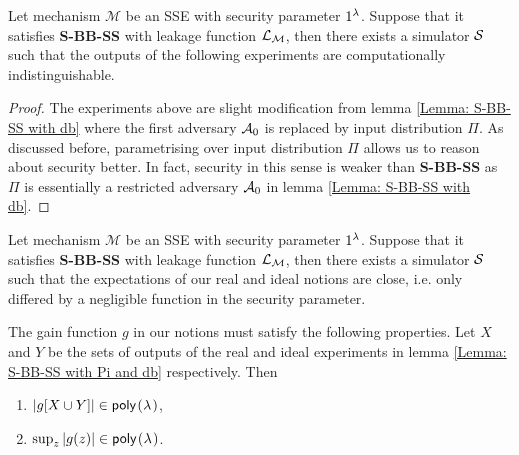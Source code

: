 \begin{lemma} \label{Lemma: S-BB-SS with Pi and db}
	\normalfont
	Let mechanism $\mathcal{M}$ be an SSE with security parameter $1^{\lambda}$. Suppose that it satisfies \textbf{S-BB-SS} with leakage function $\mathcal{L}_\mathcal{M}$, then there exists a simulator $\mathcal{S}$ such that the outputs of the following experiments are computationally indistinguishable.
	
	\begin{pchstack}[center]
		
		\pchspace
	\end{pchstack}
\end{lemma}

\begin{proof}
	The experiments above are slight modification from lemma \ref{Lemma: S-BB-SS with db} where the first adversary $\mathcal{A}_0$ is replaced by input distribution $\Pi$. As discussed before, parametrising over input distribution $\Pi$ allows us to reason about security better. In fact, security in this sense is weaker than \textbf{S-BB-SS} as $\Pi$ is essentially a restricted adversary $\mathcal{A}_0$ in lemma \ref{Lemma: S-BB-SS with db}.
\end{proof}


\begin{lemma}
	Let mechanism $\mathcal{M}$ be an SSE with security parameter $1^{\lambda}$. Suppose that it satisfies \textbf{S-BB-SS} with leakage function $\mathcal{L}_\mathcal{M}$, then there exists a simulator $\mathcal{S}$ such that the expectations of our real and ideal notions are close, i.e. only differed by a negligible function in the security parameter.
	
	The gain function $g$ in our notions must satisfy the following properties. Let $X$ and $Y$ be the sets of outputs of the real and ideal experiments in lemma \ref{Lemma: S-BB-SS with Pi and db} respectively. Then
	\begin{enumerate}
		\item $|g[X \cup Y]| \in \poly$,
		\item $\sup_{z} |g(z)| \in \poly$.
	\end{enumerate}
\end{lemma}


